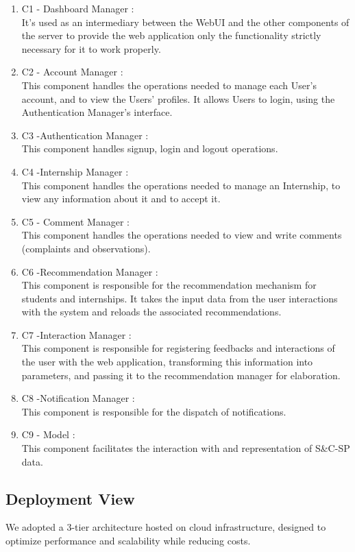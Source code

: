 \documentclass[a4paper,12pt]{article}
\begin{document}
\begin{enumerate}
    \item {C1 - Dashboard Manager} :
    \\It's used as an intermediary between the WebUI and the
    other components of the server to provide the web application only the functionality
    strictly necessary for it to work properly.
    \item {C2 - Account Manager} :
    \\This component handles the operations needed to manage each User's account, and to view the Users' profiles. It allows Users to login, using the Authentication Manager's interface.
    \item {C3 -Authentication Manager} :
    \\This component handles signup, login and logout operations.
    \item {C4 -Internship Manager} :
    \\This component handles the operations needed to manage an Internship, to view any information about it and to accept it.
    \item {C5 - Comment Manager} :
    \\This component handles the operations needed to view and write comments (complaints and observations).
    \item {C6 -Recommendation Manager} :
    \\This component is responsible for the recommendation mechanism for students and internships. It takes the input data from the user interactions with the system and reloads the associated recommendations.
    \item {C7 -Interaction Manager} :
    \\This component is responsible for registering feedbacks and interactions of the user with the web application, transforming this information into parameters, and passing it to the recommendation manager for elaboration.
    \item {C8 -Notification Manager} :
    \\This component is responsible for the dispatch of notifications.
    \item {C9 - Model} :
    \\This component facilitates the interaction with and representation of S\&C-SP data.
\end{enumerate}
\subsection{Deployment View}
We adopted a 3-tier architecture hosted on cloud infrastructure, designed to optimize performance and scalability while reducing costs.
\end{document}
